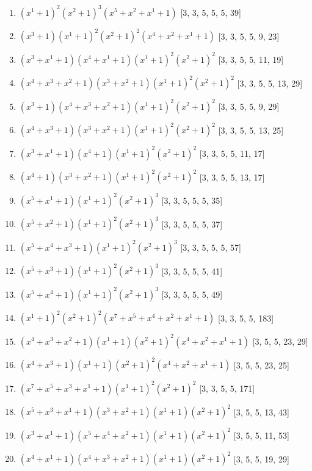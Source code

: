 \documentclass[10pt,twocolumn]{article}
\begin{document}
\begin{enumerate}
\item $(x^{1} + 1)^{2}(x^{2} + 1)^{3}(x^{5} + x^{2} + x^{1} + 1)$  [3, 3, 5, 5, 5, 39]
\item $(x^{3} + 1)(x^{1} + 1)^{2}(x^{2} + 1)^{2}(x^{4} + x^{2} + x^{1} + 1)$  [3, 3, 5, 5, 9, 23]
\item $(x^{3} + x^{1} + 1)(x^{4} + x^{1} + 1)(x^{1} + 1)^{2}(x^{2} + 1)^{2}$  [3, 3, 5, 5, 11, 19]
\item $(x^{4} + x^{3} + x^{2} + 1)(x^{3} + x^{2} + 1)(x^{1} + 1)^{2}(x^{2} + 1)^{2}$  [3, 3, 5, 5, 13, 29]
\item $(x^{3} + 1)(x^{4} + x^{3} + x^{2} + 1)(x^{1} + 1)^{2}(x^{2} + 1)^{2}$  [3, 3, 5, 5, 9, 29]
\item $(x^{4} + x^{3} + 1)(x^{3} + x^{2} + 1)(x^{1} + 1)^{2}(x^{2} + 1)^{2}$  [3, 3, 5, 5, 13, 25]
\item $(x^{3} + x^{1} + 1)(x^{4} + 1)(x^{1} + 1)^{2}(x^{2} + 1)^{2}$  [3, 3, 5, 5, 11, 17]
\item $(x^{4} + 1)(x^{3} + x^{2} + 1)(x^{1} + 1)^{2}(x^{2} + 1)^{2}$  [3, 3, 5, 5, 13, 17]
\item $(x^{5} + x^{1} + 1)(x^{1} + 1)^{2}(x^{2} + 1)^{3}$  [3, 3, 5, 5, 5, 35]
\item $(x^{5} + x^{2} + 1)(x^{1} + 1)^{2}(x^{2} + 1)^{3}$  [3, 3, 5, 5, 5, 37]
\item $(x^{5} + x^{4} + x^{3} + 1)(x^{1} + 1)^{2}(x^{2} + 1)^{3}$  [3, 3, 5, 5, 5, 57]
\item $(x^{5} + x^{3} + 1)(x^{1} + 1)^{2}(x^{2} + 1)^{3}$  [3, 3, 5, 5, 5, 41]
\item $(x^{5} + x^{4} + 1)(x^{1} + 1)^{2}(x^{2} + 1)^{3}$  [3, 3, 5, 5, 5, 49]
\item $(x^{1} + 1)^{2}(x^{2} + 1)^{2}(x^{7} + x^{5} + x^{4} + x^{2} + x^{1} + 1)$  [3, 3, 5, 5, 183]
\item $(x^{4} + x^{3} + x^{2} + 1)(x^{1} + 1)(x^{2} + 1)^{2}(x^{4} + x^{2} + x^{1} + 1)$  [3, 5, 5, 23, 29]
\item $(x^{4} + x^{3} + 1)(x^{1} + 1)(x^{2} + 1)^{2}(x^{4} + x^{2} + x^{1} + 1)$  [3, 5, 5, 23, 25]
\item $(x^{7} + x^{5} + x^{3} + x^{1} + 1)(x^{1} + 1)^{2}(x^{2} + 1)^{2}$  [3, 3, 5, 5, 171]
\item $(x^{5} + x^{3} + x^{1} + 1)(x^{3} + x^{2} + 1)(x^{1} + 1)(x^{2} + 1)^{2}$  [3, 5, 5, 13, 43]
\item $(x^{3} + x^{1} + 1)(x^{5} + x^{4} + x^{2} + 1)(x^{1} + 1)(x^{2} + 1)^{2}$  [3, 5, 5, 11, 53]
\item $(x^{4} + x^{1} + 1)(x^{4} + x^{3} + x^{2} + 1)(x^{1} + 1)(x^{2} + 1)^{2}$  [3, 5, 5, 19, 29]

\end{enumerate}
\end{document}
